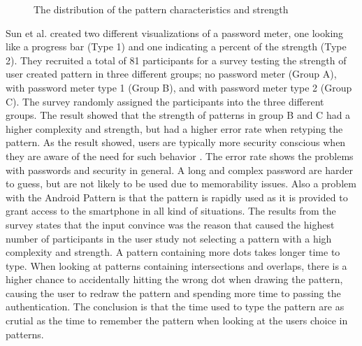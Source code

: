 \begin{figure}[H]
{        \label{fig:patterngraph3}
      }
      \caption{The distribution of the pattern characteristics and strength \cite{Sun}}
      \label{fig:patterngraph}
    \end{figure}

  Sun et al. \cite{Sun} created two different visualizations of a password meter, one looking like a progress bar (Type 1) and one indicating a percent of the strength (Type 2). They recruited a total of 81 participants for a survey testing the strength of user created pattern in three different groups; no password meter (Group A), with password meter type 1 (Group B), and with password meter type 2 (Group C). The survey randomly assigned the participants into the three different groups. The result showed that the strength of patterns in group B and C had a higher complexity and strength, but had a higher error rate when retyping the pattern. As the result showed, users are typically more security conscious when they are aware of the need for such behavior \cite{Sasse}. The error rate shows the problems with passwords and security in general. A long and complex password are harder to guess, but are not likely to be used due to memorability issues. Also a problem with the Android Pattern is that the pattern is rapidly used as it is provided to grant access to the smartphone in all kind of situations. The results from the survey states that the input convince was the reason that caused the highest number of participants in the user study not selecting a pattern with a high complexity and strength. A pattern containing more dots takes longer time to type. When looking at patterns containing intersections and overlaps, there is a higher chance to accidentally hitting the wrong dot when drawing the pattern, causing the user to redraw the pattern and spending more time to passing the authentication. The conclusion is that the time used to type the pattern are as crutial as the time to remember the pattern when looking at the users choice in patterns.

